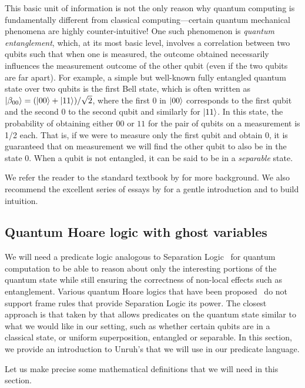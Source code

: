 \documentclass[adraft,creativecommons]{eptcs}
\theoremstyle{definition}
\theoremstyle{remark}
\begin{document}
This basic unit of information is not the only reason why quantum computing is fundamentally different from classical computing---certain quantum mechanical phenomena are highly counter-intuitive! One such phenomenon is \textit{quantum entanglement}, which, at its most basic level, involves a correlation between two qubits such that when one is measured, the outcome obtained necessarily influences the measurement outcome of the other qubit (even if the two qubits are far apart). For example, a simple but well-known fully entangled quantum state over two qubits is the first Bell state, which is often written as $\ket{\beta_{00}} = (\ket{00}+\ket{11})/\sqrt{2}$, where the first $0$ in $\ket{00}$ corresponds to the first qubit and the second $0$ to the second qubit and similarly for $\ket{11}$. In this state, the probability of obtaining either $00$ or $11$ for the pair of qubits on a measurement is 1/2 each. That is, if we were to measure only the first qubit and obtain $0$, it is guaranteed that on measurement we will find the other qubit to also be in the state $0$. When a qubit is not entangled, it can be said to be in a \textit{separable} state.

We refer the reader to the standard textbook by \textcite{nielsen2010} for more background. We also recommend the excellent series of essays by \textcite{matuschak2019} for a gentle introduction and to build intuition.

\subsection{Quantum Hoare logic with ghost variables}

We will need a predicate logic analogous to Separation Logic~\parencite{reynolds2002} for quantum computation to be able to reason about only the interesting portions of the quantum state while still ensuring the correctness of non-local effects such as entanglement. Various quantum Hoare logics that have been proposed~\parencite{aqhl2019,floydhoare2012,wpe2016} do not support frame rules that provide Separation Logic its power. The closest approach is that taken by \textcite{unruh2019} that allows predicates on the quantum state similar to what we would like in our setting, such as whether certain qubits are in a classical state, or uniform superposition, entangled or separable. In this section, we provide an introduction to Unruh's  that we will use in our predicate language.

Let us make precise some mathematical definitions that we will need in this section.
\end{document}

